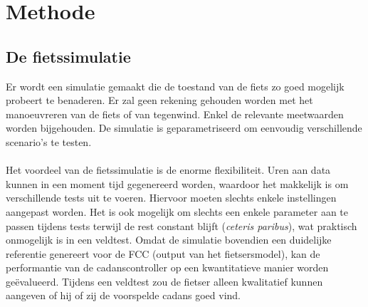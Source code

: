 \chapter{Methode}
\section{De fietssimulatie}
Er wordt een simulatie gemaakt die de toestand van de fiets zo goed mogelijk probeert te benaderen. Er zal geen rekening gehouden worden met het manoeuvreren van de fiets of van tegenwind. Enkel de relevante meetwaarden worden bijgehouden. De simulatie is geparametriseerd om eenvoudig verschillende scenario’s te testen.
\\\\
Het voordeel van de fietssimulatie is de enorme flexibiliteit. Uren aan data kunnen in een moment tijd gegenereerd worden, waardoor het makkelijk is om verschillende tests uit te voeren. Hiervoor moeten slechts enkele instellingen aangepast worden. Het is ook mogelijk om slechts een enkele parameter aan te passen tijdens tests terwijl de rest constant blijft (\textit{ceteris paribus}), wat praktisch onmogelijk is in een veldtest. Omdat de simulatie bovendien een duidelijke referentie genereert voor de FCC (output van het fietsersmodel), kan de performantie van de cadanscontroller op een kwantitatieve manier worden geëvalueerd. Tijdens een veldtest zou de fietser alleen kwalitatief kunnen aangeven of hij of zij de voorspelde cadans goed vind. 
